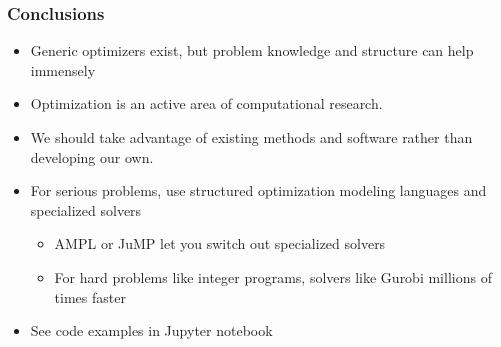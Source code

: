 \documentclass[bigger]{beamer}
\begin{document}
\begin{frame}
\frametitle{Conclusions}

\begin{itemize}

\item Generic optimizers exist, but problem knowledge and structure can help immensely

\item Optimization is an active area of computational research.


\item We should take advantage of existing methods and software rather than
developing our own.

\item For serious problems, use structured optimization modeling languages and specialized solvers
\begin{itemize}
\item AMPL or JuMP let you switch out specialized solvers
\item For hard problems like integer programs, solvers like Gurobi millions of times faster
\end{itemize}

\item See code examples in Jupyter notebook



\end{itemize}


\end{frame}
\end{document}
